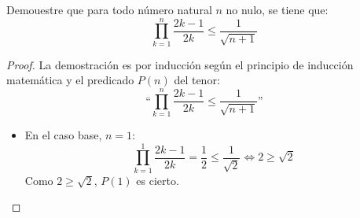 \begin{ejercicio}
    Demouestre que para todo número natural $n$ no nulo, se tiene que:
    \begin{equation*}
        \prod_{k=1}^n \frac{2k-1}{2k} \leq \frac{1}{\sqrt{n+1}}
    \end{equation*}
    \begin{proof}
        La demostración es por inducción según el principio de inducción matemática y el predicado $P(n)$ del tenor:
        \begin{equation*}
            \text{``}\prod_{k=1}^n \frac{2k-1}{2k} \leq \frac{1}{\sqrt{n+1}}\text{''}
        \end{equation*}
        \begin{itemize}
            \item En el caso base, $n=1$:
                \begin{equation*}
                    \prod_{k=1}^1 \frac{2k-1}{2k} = \frac{1}{2} \leq \frac{1}{\sqrt{2}} \Longleftrightarrow 2 \geq \sqrt{2}
                \end{equation*}
                Como $2 \geq \sqrt{2}$, $P(1)$ es cierto.


\end{itemize}
\end{proof}
\end{ejercicio}
